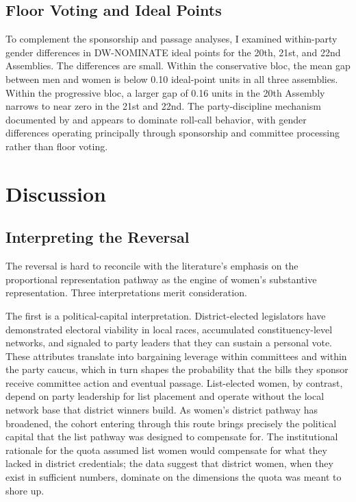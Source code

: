 \documentclass[11pt]{article}
\begin{document}
\subsection{Floor Voting and Ideal Points}

To complement the sponsorship and passage analyses, I examined within-party gender differences in DW-NOMINATE ideal points for the 20th, 21st, and 22nd Assemblies. The differences are small. Within the conservative bloc, the mean gap between men and women is below 0.10 ideal-point units in all three assemblies. Within the progressive bloc, a larger gap of 0.16 units in the 20th Assembly narrows to near zero in the 21st and 22nd. The party-discipline mechanism documented by \citet{junHix2010} and \citet{kimPark2022} appears to dominate roll-call behavior, with gender differences operating principally through sponsorship and committee processing rather than floor voting.

\section{Discussion}

\subsection{Interpreting the Reversal}

The reversal is hard to reconcile with the literature's emphasis on the proportional representation pathway as the engine of women's substantive representation. Three interpretations merit consideration.

The first is a political-capital interpretation. District-elected legislators have demonstrated electoral viability in local races, accumulated constituency-level networks, and signaled to party leaders that they can sustain a personal vote. These attributes translate into bargaining leverage within committees and within the party caucus, which in turn shapes the probability that the bills they sponsor receive committee action and eventual passage. List-elected women, by contrast, depend on party leadership for list placement and operate without the local network base that district winners build. As women's district pathway has broadened, the cohort entering through this route brings precisely the political capital that the list pathway was designed to compensate for. The institutional rationale for the quota assumed list women would compensate for what they lacked in district credentials; the data suggest that district women, when they exist in sufficient numbers, dominate on the dimensions the quota was meant to shore up.
\end{document}
